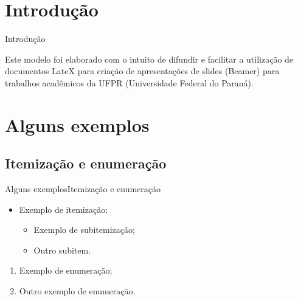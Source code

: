 \documentclass[aspectratio=169]{beamer}
\begin{document}
\section{Introdução}
\begin{frame}{Introdução}
	
	\justifying Este modelo foi elaborado com o intuito de difundir e facilitar a utilização de documentos LateX para criação de apresentações de slides (Beamer) para trabalhos acadêmicos da UFPR (Universidade Federal do Paraná).

\end{frame}



\section{Alguns exemplos}
\subsection{Itemização e enumeração}
\begin{frame}{Alguns exemplos}{Itemização e enumeração}
	
	\begin{itemize}
		\item \justifying Exemplo de itemização:
		\begin{itemize}
		    \item \justifying Exemplo de subitemização;
		    \item \justifying Outro subitem.
		\end{itemize}
	\end{itemize} \vspace{10px}
	
	\begin{enumerate}
	    \item \justifying Exemplo de enumeração;
	    \item \justifying Outro exemplo de enumeração.
	\end{enumerate}
	
\end{frame}



\end{document}
